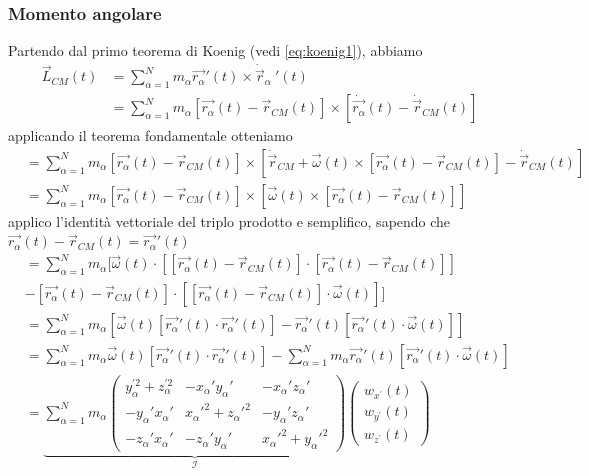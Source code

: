 \subsubsection{Momento angolare}
Partendo dal primo teorema di Koenig (vedi \ref{eq:koenig1}), abbiamo
\begin{align*}
	\vec{L}_{CM}(t) & = \sum_{\alpha=1}^N m_\alpha \vec{r_\alpha}'(t) \times \dot{\vec{r}}_\alpha\:'(t) \\
	& = \sum_{\alpha=1}^N m_\alpha [\vec{r_\alpha}(t) - \vec{r}_{CM}(t)] \times [\dot{\vec{r_\alpha}}(t) - \dot{\vec{r}}_{CM}(t)]
\end{align*}
applicando il teorema fondamentale otteniamo
\begin{align*}
	& = \sum_{\alpha=1}^N m_\alpha [\vec{r_\alpha}(t) - \vec{r}_{CM}(t)] \times [\dot{\vec{r}}_{CM} + \vec{\omega}(t) \times [\vec{r_\alpha}(t) - \vec{r}_{CM}(t)]-\dot{\vec{r}}_{CM}(t)] \\
	& = \sum_{\alpha=1}^N m_\alpha [\vec{r_\alpha}(t) - \vec{r}_{CM}(t)] \times [\vec{\omega}(t) \times [\vec{r_\alpha}(t) - \vec{r}_{CM}(t)]]
\end{align*}
applico l'identità vettoriale del triplo prodotto e semplifico, sapendo che $\vec{r_\alpha}(t) - \vec{r}_{CM}(t) = \vec{r_\alpha}'(t)$
\begin{align*}
	& = \sum_{\alpha=1}^N m_\alpha [\vec{\omega}(t) \cdot [[\vec{r_\alpha}(t) - \vec{r}_{CM}(t)] \cdot [\vec{r_\alpha}(t) - \vec{r}_{CM}(t)]] \\
	& - [\vec{r_\alpha}(t) - \vec{r}_{CM}(t)] \cdot [[\vec{r_\alpha}(t) - \vec{r}_{CM}(t)] \cdot \vec{\omega}(t)]] \\
	& = \sum_{\alpha=1}^N m_\alpha [\vec{\omega}(t)[\vec{r_\alpha}'(t) \cdot \vec{r_\alpha}'(t)] - \vec{r_\alpha}'(t)[\vec{r_\alpha}'(t) \cdot \vec{\omega}(t)]] \\
	& =\sum_{\alpha=1}^N m_\alpha \vec{\omega}(t)[\vec{r_\alpha}'(t) \cdot \vec{r_\alpha}'(t)] -  \sum_{\alpha=1}^N m_\alpha \vec{r_\alpha}'(t)[\vec{r_\alpha}'(t) \cdot \vec{\omega}(t)] \\
	& =  \underbrace{\sum_{\alpha=1}^N m_\alpha \begin{pmatrix}
		y_\alpha^{\prime2} + z_\alpha^{\prime2} & -x_\alpha'y_\alpha' & -x_\alpha'z_\alpha' \\
		-y_\alpha'x_\alpha' & x_\alpha'^2+z_\alpha'^2 & -y_\alpha'z_\alpha' \\
		-z_\alpha'x_\alpha' & -z_\alpha'y_\alpha' & x_\alpha'^2+y_\alpha'^2
	\end{pmatrix}}_\mathcal{I} \begin{pmatrix}
	w_{x^\prime}(t) \\ w_{y^\prime}(t) \\ w_{z^\prime}(t)
	\end{pmatrix}
\end{align*}

